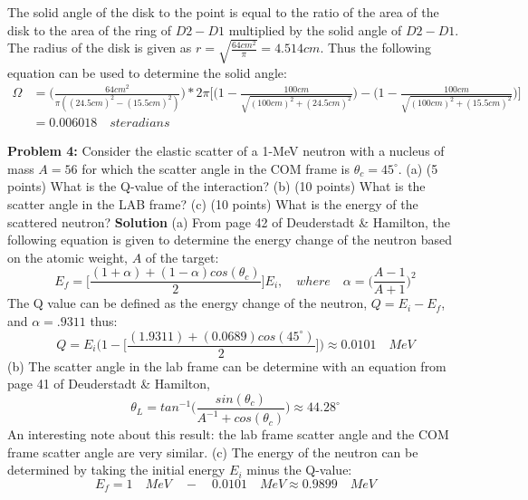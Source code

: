 \documentclass{amsart}
\theoremstyle{definition}
\begin{document}
\bigbreak
The solid angle of the disk to the point is equal to the ratio of the area of the disk to the area of the ring of $D2-D1$ multiplied by the solid angle of $D2-D1$. The radius of the disk is given as $r=\sqrt{\frac{64cm^2}{\pi}}=4.514 cm$. Thus the following equation can be used to determine the solid angle:
\bigbreak
\begin{align*}
   \Omega  &= \bigg(\frac{64cm^2}{\pi((24.5cm)^2-(15.5cm)^2)}\bigg)*2\pi\bigg[\bigg( 1- \frac{100cm}{\sqrt{(100cm)^2+(24.5cm)^2}}\bigg)-\bigg( 1- \frac{100cm}{\sqrt{(100cm)^2+(15.5cm)^2}}\bigg)\bigg] \\
   &= \boxed{0.006018 \quad steradians}
\end{align*}
\bigbreak
 
 
\newpage 
\textbf{Problem 4:} Consider the elastic scatter of a 1-MeV neutron with a nucleus of mass $ A=56$ for which the scatter angle in the COM frame is $\theta_c = 45^\circ$. \newline
(a) (5 points) What is the Q-value of the interaction? \newline
(b) (10 points) What is the scatter angle in the LAB frame? \newline
(c) (10 points) What is the energy of the scattered neutron? \newline
\textbf{Solution}
(a) From page 42 of Deuderstadt \& Hamilton, the following equation is given to determine the energy change of the neutron based on the atomic weight, $A$ of the target:
\bigbreak
\begin{equation*}
   E_f = \bigg[\frac{(1+\alpha)+(1-\alpha)cos(\theta_c)}{2}\bigg]E_i, \quad where \quad \alpha=\bigg(\frac{A-1}{A+1}\bigg)^2
\end{equation*}
\bigbreak
The Q value can be defined as the energy change of the neutron, $Q=E_i-E_f$, and $\alpha=.9311$ thus:
\bigbreak
\begin{equation*}
   Q = E_i\bigg(1- \bigg[\frac{(1.9311)+(0.0689)cos(45^\circ)}{2}\bigg]\bigg) \approx \boxed{0.0101 \quad MeV}
\end{equation*}
\bigbreak
(b) The scatter angle in the lab frame can be determine with an equation from page 41 of Deuderstadt \& Hamilton,
\bigbreak
\begin{equation*}
   \theta_L = tan^{-1}\bigg(\frac{sin(\theta_c)}{A^{-1}+cos(\theta_c)}\bigg) \approx \boxed{44.28^\circ}
\end{equation*}
\bigbreak
An interesting note about this result: the lab frame scatter angle and the COM frame scatter angle are very similar.
\bigbreak
(c) The energy of the neutron can be determined by taking the initial energy $E_i$ minus the Q-value:
\begin{equation*}
   E_f = 1 \quad MeV \quad - \quad 0.0101 \quad MeV \approx \boxed{0.9899 \quad MeV}
\end{equation*}
\end{document}
